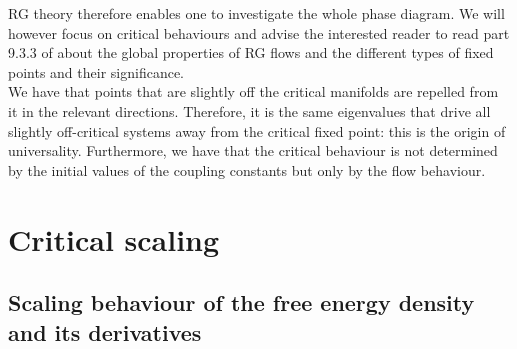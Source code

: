 \documentclass[class=report, float=false, crop=false]{standalone}
\begin{document}
RG theory therefore enables one to investigate the whole phase diagram. We will however focus on critical behaviours and advise the interested reader to read part 9.3.3 of \cite{goldenfeld1992lectures} about the global properties of RG flows and the different types of fixed points and their significance.\\

We have that points that are slightly off the critical manifolds are repelled from it in the relevant directions. Therefore, it is the same eigenvalues that drive all slightly off-critical systems away from the critical fixed point: this is the origin of universality. Furthermore, we have that the critical behaviour is not determined by the initial values of the coupling constants but only by the flow behaviour.

\section{Critical scaling}

\subsection{Scaling behaviour of the free energy density and its derivatives}
\end{document}
